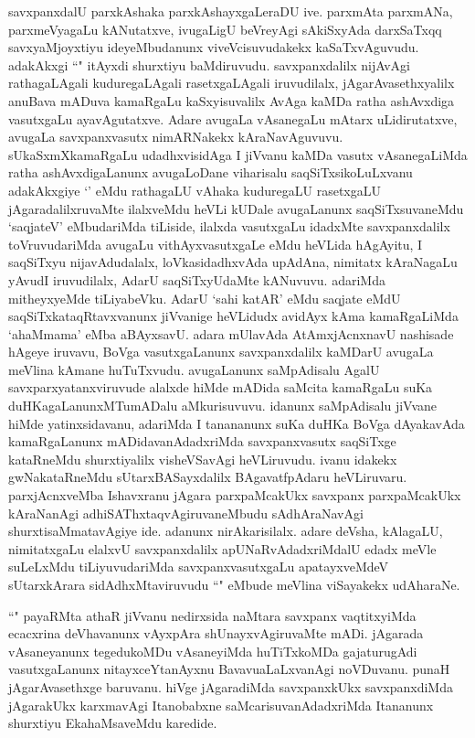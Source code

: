 \begin{artha}
savxpanxdalU parxkAshaka parxkAshayxgaLeraDU ive. parxmAta parxmANa, parxmeVyagaLu kANutatxve, ivugaLigU beVreyAgi sAkiSxyAda darxSaTxqq savxyaMjoyxtiyu ideyeMbudanunx viveVcisuvudakekx kaSaTxvAguvudu. adakAkxgi ``\stext " itAyxdi shurxtiyu baMdiruvudu. savxpanxdalilx nijAvAgi rathagaLAgali kuduregaLAgali rasetxgaLAgali iruvudilalx, jAgarAvasethxyalilx anuBava mADuva kamaRgaLu kaSxyisuvalilx AvAga kaMDa ratha ashAvxdiga vasutxgaLu ayavAgutatxve. Adare avugaLa vAsanegaLu mAtarx uLidirutatxve, avugaLa savxpanxvasutx nimARNakekx kAraNavAguvuvu. sUkaSxmXkamaRgaLu udadhxvisidAga I jiVvanu kaMDa vasutx vAsanegaLiMda ratha ashAvxdigaLanunx avugaLoDane viharisalu saqSiTxsikoLuLxvanu adakAkxgiye `\stext ' eMdu rathagaLU vAhaka kuduregaLU rasetxgaLU jAgaradalilxruvaMte ilalxveMdu heVLi kUDale avugaLanunx saqSiTxsuvaneMdu `saqjateV' eMbudariMda tiLiside, ilalxda vasutxgaLu idadxMte savxpanxdalilx toVruvudariMda avugaLu vithAyxvasutxgaLe eMdu heVLida hAgAyitu, I saqSiTxyu nijavAdudalalx, loVkasidadhxvAda upAdAna, nimitatx kAraNagaLu yAvudI iruvudilalx, AdarU saqSiTxyUdaMte kANuvuvu. adariMda mitheyxyeMde tiLiyabeVku. AdarU `sahi katAR' eMdu saqjate eMdU saqSiTxkataqRtavxvanunx jiVvanige heVLidudx avidAyx kAma kamaRgaLiMda `ahaMmama' eMba aBAyxsavU. adara mUlavAda AtAmxjAcnxnavU nashisade hAgeye iruvavu, BoVga vasutxgaLanunx savxpanxdalilx kaMDarU avugaLa meVlina kAmane huTuTxvudu. avugaLanunx saMpAdisalu AgalU savxparxyatanxviruvude alalxde hiMde mADida saMcita kamaRgaLu suKa duHKagaLanunxMTumADalu aMkurisuvuvu. idanunx saMpAdisalu jiVvane hiMde yatinxsidavanu, adariMda I tanananunx suKa duHKa BoVga dAyakavAda kamaRgaLanunx mADidavanAdadxriMda savxpanxvasutx saqSiTxge kataRneMdu shurxtiyalilx visheVSavAgi heVLiruvudu. ivanu idakekx gwNakataRneMdu sUtarxBASayxdalilx BAgavatfpAdaru heVLiruvaru. parxjAcnxveMba Ishavxranu jAgara parxpaMcakUkx savxpanx parxpaMcakUkx kAraNanAgi adhiSAThxtaqvAgiruvaneMbudu sAdhAraNavAgi shurxtisaMmatavAgiye ide. adanunx nirAkarisilalx. adare deVsha, kAlagaLU, nimitatxgaLu elalxvU savxpanxdalilx apUNaRvAdadxriMdalU edadx meVle suLeLxMdu tiLiyuvudariMda savxpanxvasutxgaLu apatayxveMdeV sUtarxkArara sidAdhxMtaviruvudu ``\stext "  eMbude meVlina viSayakekx udAharaNe.
\end{artha}%


\begin{artha}
``\stext " payaRMta athaR jiVvanu nedirxsida naMtara savxpanx vaqtitxyiMda ecacxrina deVhavanunx vAyxpAra shUnayxvAgiruvaMte mADi. jAgarada vAsaneyanunx tegedukoMDu vAsaneyiMda huTiTxkoMDa gajaturugAdi vasutxgaLanunx nitayxceYtanAyxnu BavavuaLaLxvanAgi noVDuvanu. punaH jAgarAvasethxge baruvanu. hiVge jAgaradiMda savxpanxkUkx savxpanxdiMda jAgarakUkx karxmavAgi Itanobabxne saMcarisuvanAdadxriMda Itananunx shurxtiyu EkahaMsaveMdu karedide. 
\end{artha}

